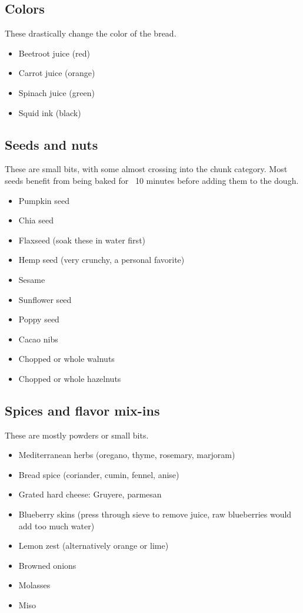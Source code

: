 \subsection{Colors}
These drastically change the color of the bread.
\begin{itemize}
  \item Beetroot juice (red)
  \item Carrot juice (orange)
  \item Spinach juice (green)
  \item Squid ink (black)
\end{itemize}

\subsection{Seeds and nuts}
These are small bits, with some almost crossing into the chunk category. Most
seeds benefit from being baked for ~10 minutes before adding them to the
dough.
\begin{itemize}
  \item Pumpkin seed
  \item Chia seed
  \item Flaxseed  (soak these in water first)
  \item Hemp seed (very crunchy, a personal favorite)
  \item Sesame
  \item Sunflower seed
  \item Poppy seed
  \item Cacao nibs
  \item Chopped or whole walnuts
  \item Chopped or whole hazelnuts
\end{itemize}

\subsection{Spices and flavor mix-ins}
These are mostly powders or small bits.
\begin{itemize}
  \item Mediterranean herbs (oregano, thyme, rosemary, marjoram)
  \item Bread spice (coriander, cumin, fennel, anise)
  \item Grated hard cheese: Gruyere, parmesan
  \item Blueberry skins (press through sieve to remove juice, raw blueberries would add too much water)
  \item Lemon zest (alternatively orange or lime)
  \item Browned onions
  \item Molasses
  \item Miso
\end{itemize}

